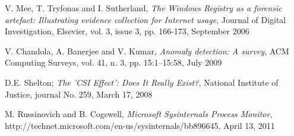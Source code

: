 \documentclass[runningheads]{llncs}
\begin{document}
\begin{thebibliography}{1}









V. Mee, T. Tryfonas and I. Sutherland, \emph{The Windows Registry as
a forensic artefact: Illustrating evidence collection for Internet usage}, Journal of Digital Investigation, Elsevier, vol. 3, issue 3, pp. 166-173, September 2006

V. Chandola, A. Banerjee and V. Kumar, \emph{Anomaly detection: A
survey}, ACM Computing Surveys, vol. 41, n. 3, pp. 15:1--15:58, July 2009

D.E. Shelton; \emph{The 'CSI Effect': Does It Really Exist?},
National Institute of Justice, journal No. 259, March 17, 2008

M. Russinovich and B. Cogswell, \emph{Microsoft Sysinternals Process Monitor}, 
http://technet.microsoft.com/en-us/sysinternals/bb896645, April 13, 2011


\end{thebibliography}
\end{document}
